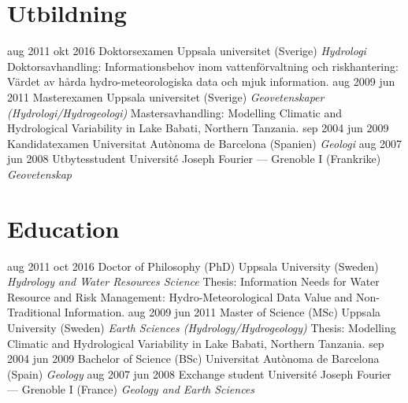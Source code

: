 \ifswedish
  \section{Utbildning}
    \position
      {aug 2011 \textemdash{} okt 2016}
      {Doktorsexamen}
      {Uppsala universitet (Sverige)}
      {\textit{Hydrologi} \newline Doktorsavhandling: Informationsbehov inom vattenförvaltning och riskhantering: Värdet av hårda hydro-meteorologiska data och mjuk information.}
    \position
      {aug 2009 \textemdash{} jun 2011}
      {Masterexamen}
      {Uppsala universitet (Sverige)}
      {\textit{Geovetenskaper (Hydrologi/Hydrogeologi)} \newline Mastersavhandling: Modelling Climatic and Hydrological Variability in Lake Babati, Northern Tanzania.}
    \position
      {sep 2004 \textemdash{} jun 2009}
      {Kandidatexamen}
      {Universitat Autònoma de Barcelona (Spanien)}
      {\textit{Geologi}}
    \position
      {aug 2007 \textemdash{} jun 2008}
      {Utbytesstudent}
      {Université Joseph Fourier --- Grenoble I (Frankrike)}
      {\textit{Geovetenskap}}
\else
  \section{Education}
    \position
      {aug 2011 \textemdash{} oct 2016}
      {Doctor of Philosophy (PhD)}
      {Uppsala University (Sweden)}
      {\textit{Hydrology and Water Resources Science} \newline Thesis: Information Needs for Water Resource and Risk Management: Hydro-Meteorological Data Value and Non-Traditional Information.}
    \position
      {aug 2009 \textemdash{} jun 2011}
      {Master of Science (MSc)}
      {Uppsala University (Sweden)}
      {\textit{Earth Sciences (Hydrology/Hydrogeology)} \newline Thesis: Modelling Climatic and Hydrological Variability in Lake Babati, Northern Tanzania.}
    \position
      {sep 2004 \textemdash{} jun 2009}
      {Bachelor of Science (BSc)}
      {Universitat Autònoma de Barcelona (Spain)}
      {\textit{Geology}}
    \position
      {aug 2007 \textemdash{} jun 2008}
      {Exchange student}
      {Université Joseph Fourier --- Grenoble I (France)}
      {\textit{Geology and Earth Sciences}}
\fi
